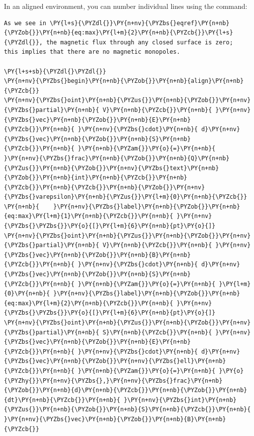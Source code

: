 \documentclass[a4paper,twoside]{article}
\begin{document}
In an aligned environment, you can number individual lines using the  command:
\begin{tscode}[lang=latex, engine=pygments]
\begin{Verbatim}[commandchars=\\\{\},breaklines, breakanywhere, commandchars=\\\{\}]
As we see in \PY{l+s}{\PYZdl{}}\PY{n+nv}{\PYZbs{}eqref}\PY{n+nb}{\PYZob{}}\PY{n+nb}{eq:max}\PY{l+m}{2}\PY{n+nb}{\PYZcb{}}\PY{l+s}{\PYZdl{}}, the magnetic flux through any closed surface is zero;
this implies that there are no magnetic monopoles.

\PY{l+s+sb}{\PYZdl{}\PYZdl{}}
\PY{n+nv}{\PYZbs{}begin}\PY{n+nb}{\PYZob{}}\PY{n+nb}{align}\PY{n+nb}{\PYZcb{}}
\PY{n+nv}{\PYZbs{}oint}\PY{n+nb}{\PYZus{}}\PY{n+nb}{\PYZob{}}\PY{n+nv}{\PYZbs{}partial}\PY{n+nb}{ V}\PY{n+nb}{\PYZcb{}}\PY{n+nb}{ }\PY{n+nv}{\PYZbs{}vec}\PY{n+nb}{\PYZob{}}\PY{n+nb}{E}\PY{n+nb}{\PYZcb{}}\PY{n+nb}{ }\PY{n+nv}{\PYZbs{}cdot}\PY{n+nb}{ d}\PY{n+nv}{\PYZbs{}vec}\PY{n+nb}{\PYZob{}}\PY{n+nb}{S}\PY{n+nb}{\PYZcb{}}\PY{n+nb}{ }\PY{n+nb}{\PYZam{}}\PY{o}{=}\PY{n+nb}{ }\PY{n+nv}{\PYZbs{}frac}\PY{n+nb}{\PYZob{}}\PY{n+nb}{Q}\PY{n+nb}{\PYZus{}}\PY{n+nb}{\PYZob{}}\PY{n+nv}{\PYZbs{}text}\PY{n+nb}{\PYZob{}}\PY{n+nb}{int}\PY{n+nb}{\PYZcb{}}\PY{n+nb}{\PYZcb{}}\PY{n+nb}{\PYZcb{}}\PY{n+nb}{\PYZob{}}\PY{n+nv}{\PYZbs{}varepsilon}\PY{n+nb}{\PYZus{}}\PY{l+m}{0}\PY{n+nb}{\PYZcb{}}
\PY{n+nb}{    }\PY{n+nv}{\PYZbs{}label}\PY{n+nb}{\PYZob{}}\PY{n+nb}{eq:max}\PY{l+m}{1}\PY{n+nb}{\PYZcb{}}\PY{n+nb}{ }\PY{n+nv}{\PYZbs{}\PYZbs{}}\PY{o}{[}\PY{l+m}{6}\PY{n+nb}{pt}\PY{o}{]}
\PY{n+nv}{\PYZbs{}oint}\PY{n+nb}{\PYZus{}}\PY{n+nb}{\PYZob{}}\PY{n+nv}{\PYZbs{}partial}\PY{n+nb}{ V}\PY{n+nb}{\PYZcb{}}\PY{n+nb}{ }\PY{n+nv}{\PYZbs{}vec}\PY{n+nb}{\PYZob{}}\PY{n+nb}{B}\PY{n+nb}{\PYZcb{}}\PY{n+nb}{ }\PY{n+nv}{\PYZbs{}cdot}\PY{n+nb}{ d}\PY{n+nv}{\PYZbs{}vec}\PY{n+nb}{\PYZob{}}\PY{n+nb}{S}\PY{n+nb}{\PYZcb{}}\PY{n+nb}{ }\PY{n+nb}{\PYZam{}}\PY{o}{=}\PY{n+nb}{ }\PY{l+m}{0}\PY{n+nb}{ }\PY{n+nv}{\PYZbs{}label}\PY{n+nb}{\PYZob{}}\PY{n+nb}{eq:max}\PY{l+m}{2}\PY{n+nb}{\PYZcb{}}\PY{n+nb}{ }\PY{n+nv}{\PYZbs{}\PYZbs{}}\PY{o}{[}\PY{l+m}{6}\PY{n+nb}{pt}\PY{o}{]}
\PY{n+nv}{\PYZbs{}oint}\PY{n+nb}{\PYZus{}}\PY{n+nb}{\PYZob{}}\PY{n+nv}{\PYZbs{}partial}\PY{n+nb}{ S}\PY{n+nb}{\PYZcb{}}\PY{n+nb}{ }\PY{n+nv}{\PYZbs{}vec}\PY{n+nb}{\PYZob{}}\PY{n+nb}{E}\PY{n+nb}{\PYZcb{}}\PY{n+nb}{ }\PY{n+nv}{\PYZbs{}cdot}\PY{n+nb}{ d}\PY{n+nv}{\PYZbs{}vec}\PY{n+nb}{\PYZob{}}\PY{n+nv}{\PYZbs{}ell}\PY{n+nb}{\PYZcb{}}\PY{n+nb}{ }\PY{n+nb}{\PYZam{}}\PY{o}{=}\PY{n+nb}{ }\PY{o}{\PYZhy{}}\PY{n+nv}{\PYZbs{},}\PY{n+nv}{\PYZbs{}frac}\PY{n+nb}{\PYZob{}}\PY{n+nb}{d}\PY{n+nb}{\PYZcb{}}\PY{n+nb}{\PYZob{}}\PY{n+nb}{dt}\PY{n+nb}{\PYZcb{}}\PY{n+nb}{ }\PY{n+nv}{\PYZbs{}int}\PY{n+nb}{\PYZus{}}\PY{n+nb}{\PYZob{}}\PY{n+nb}{S}\PY{n+nb}{\PYZcb{}}\PY{n+nb}{ }\PY{n+nv}{\PYZbs{}vec}\PY{n+nb}{\PYZob{}}\PY{n+nb}{B}\PY{n+nb}{\PYZcb{}}

\end{Verbatim}
\end{tscode}
\end{document}
